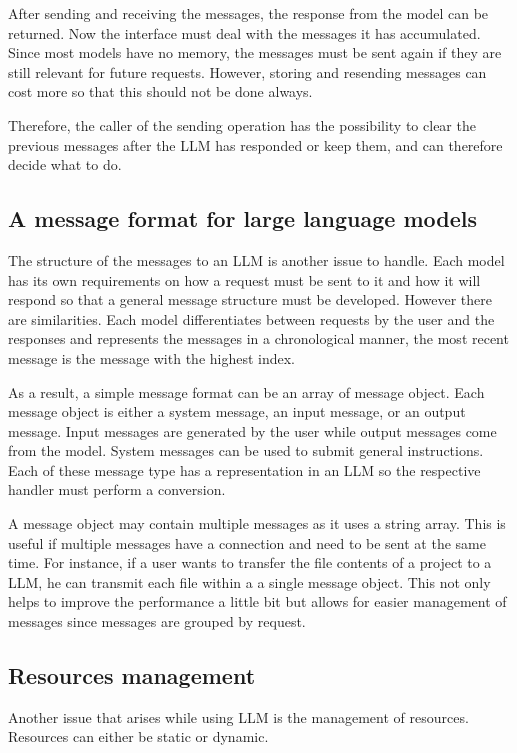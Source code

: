 After sending and receiving the messages, the response from the model can be returned. Now the interface must deal with the messages it has accumulated. Since most models have no memory, the messages must be sent again if they are still relevant for future requests. However, storing and resending messages can cost more so that this should not be done always.

Therefore, the caller of the sending operation has the possibility to clear the previous messages after the \ac{LLM} has responded or keep them, and can therefore decide what to do.

\subsection{A message format for large language models} \label{sec:llm_msg_structure}
The structure of the messages to an \ac{LLM} is another issue to handle. Each model has its own requirements on how a request must be sent to it and how it will respond so that a general message structure must be developed. However there are similarities. Each model differentiates between requests by the user and the responses and represents the messages in a chronological manner, the most recent message is the message with the highest index. 

As a result, a simple message format can be an array of message object. Each message object is either a system message, an input message, or an output message. Input messages are generated by the user while output messages come from the model. System messages can be used to submit general instructions.  Each of these message type has a representation in an \ac{LLM} so the respective handler must perform a conversion. 

A message object may contain multiple messages as it uses a string array. This is useful if multiple messages have a connection and need to be sent at the same time. For instance, if a user wants to transfer the file contents of a project to a \ac{LLM}, he can transmit each file within a a single message object. This not only helps to improve the performance a little bit but allows for easier management of messages since messages are grouped by request. 

\subsection{Resources management}\label{llm_msg_storage}

Another issue that arises while using \ac{LLM} is the management of resources. Resources can either be static or dynamic. 

